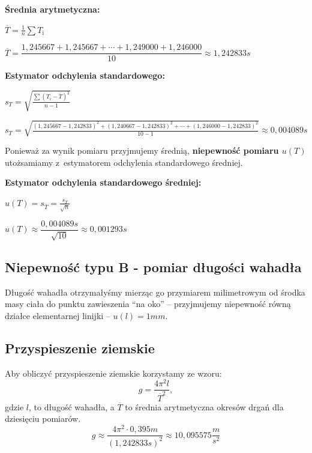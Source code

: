 \documentclass[a4paper,11pt]{article}
\begin{document}
\begin{center}
\textbf{Średnia arytmetyczna:}
\end{center}
\begin{center}
$\overline{T}=\frac{1}{n}\sum T_{\mathrm{i}}$ 
\end{center}
\begin{center} 
$\overline{T}=\dfrac{1,245667+1,245667+\cdots+1,249000+1,246000}{10}\approx1,242833s$   
\end{center}
\break
\begin{center}
\textbf{Estymator odchylenia standardowego:}
\end{center}
\begin{center}
$s_{T}=\sqrt{\frac{\sum(T_{i}-\overline{T})^{2}}{n-1}}$
\end{center}
\begin{center}
$s_{T}=\sqrt{\frac{(1,245667-1,242833)^{2}+(1,240667-1,242833)^{2}+\cdots+(1,246000-1,242833)^{2}}{10-1}}\approx0,004089s$
\end{center}
Ponieważ za wynik pomiaru przyjmujemy średnią, \textbf{niepewność pomiaru $u(T)$} utożsamiamy z~estymatorem odchylenia standardowego średniej.
\begin{center}
\textbf{Estymator odchylenia standardowego średniej:}
\end{center}
\begin{center}
$u(T)=s_{\overline{T}}=\displaystyle \frac{s_{T}}{\sqrt{n}}$
\end{center}
\begin{center}
$u(T)\approx\dfrac{0,004089s}{\sqrt{10}}\approx0,001293s$  
\end{center}

\subsection{Niepewność typu B - pomiar długości wahadła}
Długość wahadła otrzymałyśmy mierząc go przymiarem milimetrowym od środka masy ciała do punktu zawieszenia ``na oko'' -- przyjmujemy niepewność równą działce elementarnej linijki -- $u(l)=1mm$. 

\subsection{Przyspieszenie ziemskie}
Aby obliczyć przyspieszenie ziemskie korzystamy ze wzoru:
$$g=\frac{4\pi^{2}l}{\overline{T}^{2}},$$
gdzie $l$, to długość wahadła, a $\overline{T}$ to średnia arytmetyczna okresów drgań dla dziesięciu pomiarów.
$$g\approx\frac{4\pi^{2}\cdot0,395m}{(1,242833s)^{2}}\approx10,095575\dfrac{m}{s^{2}}$$
\end{document}
